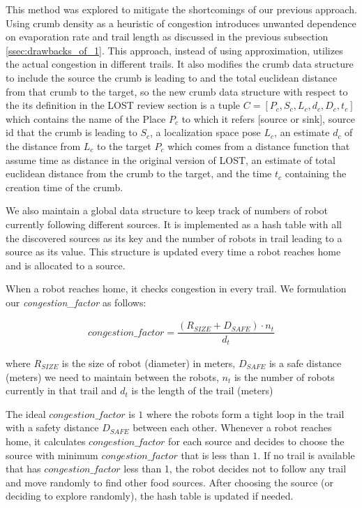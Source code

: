\documentclass[letterpaper, 10 pt, conference]{ieeeconf}  %
\begin{document}
This method was explored to mitigate the shortcomings of our previous approach. Using crumb density as a heuristic of congestion introduces unwanted dependence on evaporation rate and trail length as discussed in the previous subsection \ref{ssec:drawbacks_of_1}. This approach, instead of using approximation, utilizes the actual congestion in different trails. It also modifies the crumb data structure to include the source the crumb is leading to and the total euclidean distance from that crumb to the target, so the new crumb data structure with respect to the its definition in the LOST review section is a tuple $C = [P_c, S_c, L_c, d_c, D_c, t_c]$ which contains the name of the Place $P_c$ to which it refers [source or sink], source id that the crumb is leading to $S_c$, a localization space pose $L_c$, an estimate $d_c$ of the distance from $L_c$ to the target $P_c$ which comes from a distance function that assume time as distance in the original version of LOST, an estimate of total euclidean distance from the crumb to the target, and the time $t_c$ containing the creation time of the crumb.

We also maintain a global data structure to keep track of numbers of robot currently following different sources. It is implemented as a hash table with all the discovered sources as its key and the number of robots in trail leading to a source as its value. This structure is updated every time a robot reaches home and is allocated to a source.

When a robot reaches home, it checks congestion in every trail. We formulation our \emph{congestion\_factor} as follows:

\begin{equation}
\begin{split}
  congestion\_factor = \dfrac{(R_{SIZE} + D_{SAFE}) \cdot n_t}{ d_t }
\end{split}
\end{equation}

where $R_{SIZE}$ is the size of robot (diameter) in meters, $D_{SAFE}$ is a safe distance (meters) we need to maintain between the robots, $n_t$ is the number of robots currently in that trail and $d_t$ is the length of the trail (meters)

The ideal $congestion\_factor$ is $1$ where the robots form a tight loop in the trail with a safety distance  $D_{SAFE}$ between each other. Whenever a robot reaches home, it calculates $congestion\_factor$ for each source and decides to choose the source with minimum $congestion\_factor$ that is less than $1$. If no trail is available that has $congestion\_factor$ less than 1, the robot decides not to follow any trail and move randomly to find other food sources. After choosing the source (or deciding to explore randomly), the hash table is updated if needed.
\end{document}
